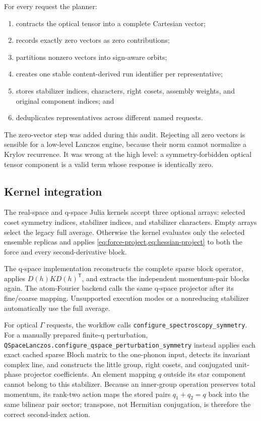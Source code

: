 \documentclass[11pt,a4paper]{article}
\begin{document}
For every request the planner:
\begin{enumerate}
  \item contracts the optical tensor into a complete Cartesian vector;
  \item records exactly zero vectors as zero contributions;
  \item partitions nonzero vectors into sign-aware orbits;
  \item creates one stable content-derived run identifier per representative;
  \item stores stabilizer indices, characters, right cosets, assembly weights,
        and original component indices; and
  \item deduplicates representatives across different named requests.
\end{enumerate}
The zero-vector step was added during this audit.  Rejecting all zero vectors
is sensible for a low-level Lanczos engine, because their norm cannot
normalize a Krylov recurrence.  It was wrong at the high level: a
symmetry-forbidden optical tensor component is a valid term whose response is
identically zero.

\subsection{Kernel integration}

The real-space and q-space Julia kernels accept three optional arrays:
selected coset symmetry indices, stabilizer indices, and stabilizer
characters.  Empty arrays select the legacy full average.  Otherwise the
kernel evaluates only the selected ensemble replicas and applies
\cref{eq:force-project,eq:hessian-project} to both the force and every
second-derivative block.

The q-space implementation reconstructs the complete sparse block operator,
applies $D(h)KD(h)^{\mathsf T}$, and extracts the independent momentum-pair
blocks again.  The atom-Fourier backend calls the same q-space projector after
its fine/coarse mapping.  Unsupported execution modes or a nonreducing
stabilizer automatically use the full average.

For optical $\Gamma$ requests, the workflow calls
\texttt{configure\_spectroscopy\_symmetry}.  For a manually prepared finite-q
perturbation, \texttt{QSpaceLanczos.configure\_qspace\_perturbation\_symmetry}
instead applies each exact cached sparse Bloch matrix to the one-phonon input,
detects its invariant complex line, and constructs the little group, right
cosets, and conjugated unit-phase projector coefficients.  An element mapping
$q$ outside its star component cannot belong to this stabilizer.  Because an
inner-group operation preserves total momentum, its rank-two action maps the
stored pairs $q_1+q_2=q$ back into the same bilinear pair sector; transpose,
not Hermitian conjugation, is therefore the correct second-index action.
\end{document}
